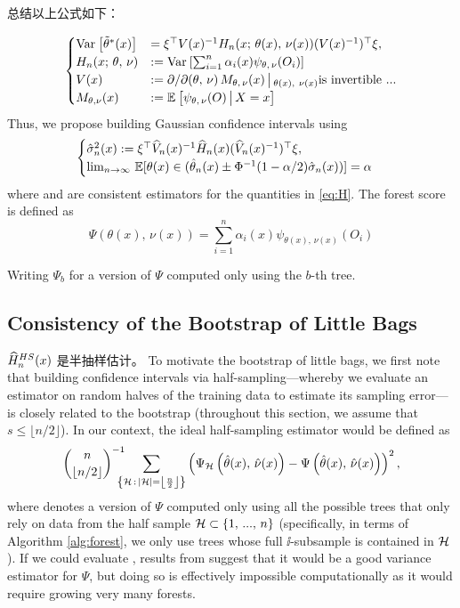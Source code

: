\documentclass[aos]{imsart}
\theoremstyle{plain}
\theoremstyle{definition}
\theoremstyle{remark}
\begin{document}
\begin{CJK}{UTF8}{gbsn}
总结以上公式如下：

\begin{equation*}
\begin{cases}
\Var{\ttheta^*(x)} &= \xi^\top V(x)^{-1} H_n(x; \, \theta(x), \, \nu(x)) (V(x)^{-1})^\top \xi, \\
H_{n}(x; \, \theta, \, \nu) &:= \Var{\sum_{i = 1}^n \alpha_i(x) \psi_{\theta, \, \nu}(O_i)} \\
V(x) &:= {\partial}/{\partial (\theta, \, \nu)} \, M_{\theta, \, \nu}(x) \cond_{\theta(x), \ \nu(x)} \text{is invertible ...} \\ 
M_{\theta, \nu}(x) &:= \EE{\psi_{\theta, \, \nu}(O) \cond X = x}  \\

\end{cases}
\end{equation*}
Thus, we propose building Gaussian confidence intervals using
\begin{equation*}
\begin{cases}
\hsigma_n^2(x) := \xi^\top \hV_n(x)^{-1} \hH_n(x) (\hV_n(x)^{-1})^\top \xi, \\
\limn \, \mathbb{E}[\theta(x) \in (\htheta_n(x) \pm \Phi^{-1}(1 -\alpha/2) \hsigma_n(x))] = \alpha
\end{cases}
\end{equation*}
where  and  are consistent estimators
for the quantities in \eqref{eq:H}. The forest  score is defined as
$$
\Psi(\theta(x), \, \nu(x)) = \sum_{i = 1}^n \alpha_i(x) \psi_{\theta(x), \, \nu(x)}(O_i)
$$

Writing $\Psi_b$ for a version of $\Psi$ computed only using the $b$-th tree. 
\subsection{Consistency of the Bootstrap of Little Bags}
\label{sec:blb}
$\widehat{H}_n^{HS}(x)$ 是半抽样估计。
To motivate the bootstrap of little bags, we first note that
building confidence intervals via half-sampling---whereby we evaluate an estimator on random
halves of the training data to estimate its sampling error---is closely related to the
bootstrap \citep{efron1982jackknife} (throughout this section, we assume that $s \leq \lfloor n/2 \rfloor$).
In our context, the ideal half-sampling estimator would be  defined as
\begin{equation}
\label{eq:hs_opt}
\binom{n}{\lfloor n/2 \rfloor}^{-1}
\!\!\!\!\!
\sum_{\cb{\hh \, : \, \abs{\hh} = \left\lfloor \frac{n}{2} \right\rfloor}}
\p{\Psi_{\hh}\p{\htheta(x), \, \hnu(x)} - \Psi\p{\htheta(x), \, \hnu(x)}}^2,
\end{equation}
where \smash{$\Psi_{\hh}$} denotes a version of $\Psi$ computed only using all the possible
trees that only rely on data from the half sample $\mathcal{H} \subset \left\{1, \, ..., \, n\right\}$ (specifically, in terms of Algorithm
\ref{alg:forest}, we only use trees whose full $\ii$-subsample is contained in $\mathcal{H}$).
If we could evaluate , results from \citet{efron1982jackknife}
suggest that it would be a good variance estimator for $\Psi$, but doing so is
effectively impossible computationally as it would require growing very many forests.


\end{CJK}
\end{document}
